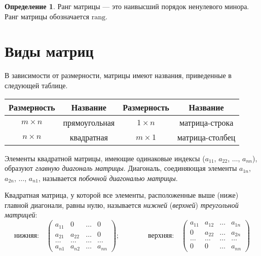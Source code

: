 \documentclass[a4paper,12pt]{extbook}
\theoremstyle{definition}
\newtheorem{definition}{Определение}[section]
\begin{document}
\begin{definition}
    Ранг матрицы — это наивысший порядок ненулевого минора. Ранг матрицы обозначается \(\mathrm{rang}\).
\end{definition}

\section{Виды матриц}
\label{sec:orgbc2a2b4}
В зависимости от размерности, матрицы имеют названия, приведенные в следующей таблице.
\begin{center}
    \begin{tabular}{|c|c|c|c|}
        Размерность    & Название      & Размерность    & Название        \\
        \hline
        \(m \times n\) & прямоугольная & \(1 \times n\) & матрица-строка  \\
        \(n \times n\) & квадратная    & \(m \times 1\) & матрица-столбец \\
    \end{tabular}
\end{center}

Элементы квадратной матрицы, имеющие одинаковые индексы (\(a_{11}\), \(a_{22}\), \(\ldots\), \(a_{nn}\)), образуют \emph{главную диагональ матрицы}. Диагональ, соединяющая элементы \(a_{1n}\), \(a_{2n}\), \(\ldots\), \(a_{n1}\), называется \emph{побочной диагональю матрицы}.

Квадратная матрица, у которой все элементы, расположенные выше (ниже) главной диагонали, равны нулю, называется \emph{нижней} (\emph{верхней}) \emph{треугольной матрицей}:
\begin{equation*}
    \text{нижняя:}
    \quad
    \begin{pmatrix}
        a_{11} & 0      & \ldots & 0      \\
        a_{21} & a_{22} & \ldots & 0      \\
        \ldots & \ldots & \ldots & \ldots \\
        a_{n1} & a_{n2} & \ldots & a_{nn}
    \end{pmatrix};
    \qquad \qquad
    \text{верхняя:}
    \quad
    \begin{pmatrix}
        a_{11} & a_{12} & \ldots & a_{1n} \\
        0      & a_{22} & \ldots & a_{2n} \\
        \ldots & \ldots & \ldots & \ldots \\
        0      & 0      & \ldots & a_{nn}
    \end{pmatrix}
\end{equation*}
\end{document}
